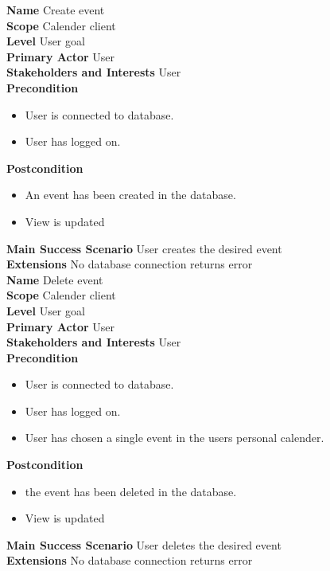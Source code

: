 \documentclass[a4paper,10pt,titlepage]{article}
\begin{document}
	\textbf{Name}
	Create event
	\\
	\textbf{Scope}
	Calender client
	\\
	\textbf{Level}
	User goal
	\\
	\textbf{Primary Actor}
	User
	\\
	\textbf{Stakeholders and Interests}
	User
	\\
	\textbf{Precondition}
		\begin{itemize}
		\item User is connected to database.
		\item User has logged on.
		\end{itemize}
	\textbf{Postcondition}
	\begin{itemize}
			\item An event has been created in the database.
			\item View is updated
	\end{itemize}
	\textbf{Main Success Scenario}
	User creates the desired event
	\\
	\textbf{Extensions}
	No database connection returns error
	\\
	
	\textbf{Name}
	Delete event
	\\
	\textbf{Scope}
	Calender client
	\\
	\textbf{Level}
	User goal
	\\
	\textbf{Primary Actor}
	User
	\\
	\textbf{Stakeholders and Interests}
	User
	\\
	\textbf{Precondition}
			\begin{itemize}
			\item User is connected to database.
			\item User has logged on.
			\item User has chosen a single event in the users personal calender.
			\end{itemize}
	\textbf{Postcondition}
		\begin{itemize}
				\item the event has been deleted in the database.
				\item View is updated
		\end{itemize}
	\textbf{Main Success Scenario}
	User deletes the desired event
	\\
	\textbf{Extensions}
	No database connection returns error
	\\
	
\end{document}
